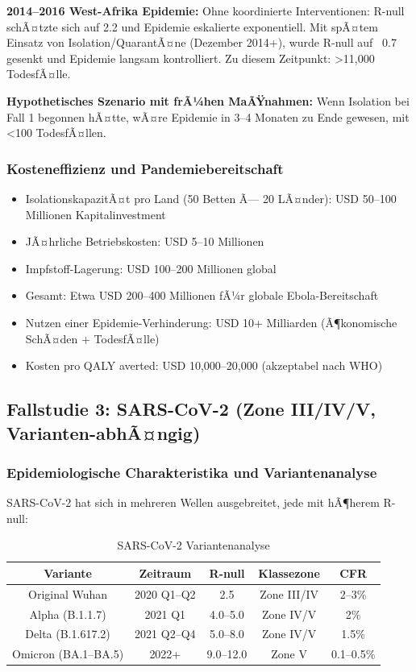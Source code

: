 ﻿\documentclass[a4paper,12pt,twoside]{article}
\theoremstyle{definition}
\begin{document}
\textbf{2014--2016 West-Afrika Epidemie:} Ohne koordinierte Interventionen: R-null schÃ¤tzte sich auf 2.2 und Epidemie eskalierte exponentiell. Mit spÃ¤tem Einsatz von Isolation/QuarantÃ¤ne (Dezember 2014+), wurde R-null auf ~0.7 gesenkt und Epidemie langsam kontrolliert. Zu diesem Zeitpunkt: >11,000 TodesfÃ¤lle.

\textbf{Hypothetisches Szenario mit frÃ¼hen MaÃŸnahmen:} Wenn Isolation bei Fall 1 begonnen hÃ¤tte, wÃ¤re Epidemie in 3--4 Monaten zu Ende gewesen, mit <100 TodesfÃ¤llen.

\subsubsection{Kosteneffizienz und Pandemiebereitschaft}

\begin{itemize}
\item IsolationskapazitÃ¤t pro Land (50 Betten Ã— 20 LÃ¤nder): USD 50--100 Millionen Kapitalinvestment
\item JÃ¤hrliche Betriebskosten: USD 5--10 Millionen
\item Impfstoff-Lagerung: USD 100--200 Millionen global
\item Gesamt: Etwa USD 200--400 Millionen fÃ¼r globale Ebola-Bereitschaft
\item Nutzen einer Epidemie-Verhinderung: USD 10+ Milliarden (Ã¶konomische SchÃ¤den + TodesfÃ¤lle)
\item Kosten pro QALY averted: USD 10,000--20,000 (akzeptabel nach WHO)
\end{itemize}

\subsection{Fallstudie 3: SARS-CoV-2 (Zone III/IV/V, Varianten-abhÃ¤ngig)}

\subsubsection{Epidemiologische Charakteristika und Variantenanalyse}

SARS-CoV-2 hat sich in mehreren Wellen ausgebreitet, jede mit hÃ¶herem R-null:

\begin{table}[h!]
\centering
\caption{SARS-CoV-2 Variantenanalyse}
\begin{tabular}{|c|c|c|c|c|}
\hline
\textbf{Variante} & \textbf{Zeitraum} & \textbf{R-null} & \textbf{Klassezone} & \textbf{CFR} \\
\hline
Original Wuhan & 2020 Q1--Q2 & 2.5 & Zone III/IV & 2--3\% \\
Alpha (B.1.1.7) & 2021 Q1 & 4.0--5.0 & Zone IV/V & 2\% \\
Delta (B.1.617.2) & 2021 Q2--Q4 & 5.0--8.0 & Zone IV/V & 1.5\% \\
Omicron (BA.1--BA.5) & 2022+ & 9.0--12.0 & Zone V & 0.1--0.5\% \\
\hline
\end{tabular}
\end{table}
\end{document}
